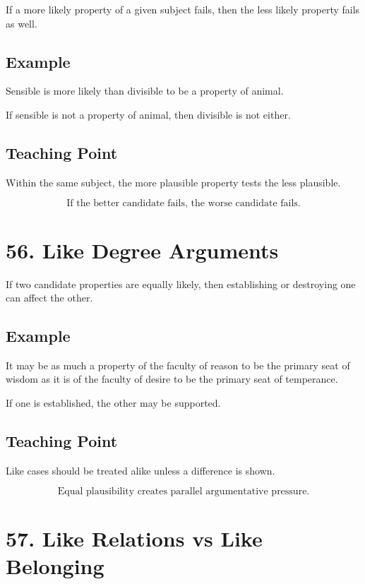 \documentclass[12pt]{article}
\begin{document}
If a more likely property of a given subject fails, then the less likely
property fails as well.

\subsection*{Example}

Sensible is more likely than divisible to be a property of animal.

If sensible is not a property of animal, then divisible is not either.

\subsection*{Teaching Point}

Within the same subject, the more plausible property tests the less plausible.

\[
\boxed{
\text{If the better candidate fails, the worse candidate fails.}
}
\]

\section*{56. Like Degree Arguments}

If two candidate properties are equally likely, then establishing or destroying
one can affect the other.

\subsection*{Example}

It may be as much a property of the faculty of reason to be the primary seat of
wisdom as it is of the faculty of desire to be the primary seat of temperance.

If one is established, the other may be supported.

\subsection*{Teaching Point}

Like cases should be treated alike unless a difference is shown.

\[
\boxed{
\text{Equal plausibility creates parallel argumentative pressure.}
}
\]

\section*{57. Like Relations vs Like Belonging}
\end{document}
